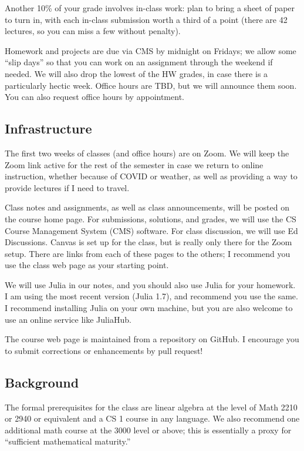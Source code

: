 \documentclass[12pt, leqno]{article}
\begin{document}
Another 10\% of your grade involves in-class work: plan to bring a
sheet of paper to turn in, with each in-class submission worth a third
of a point (there are 42 lectures, so you can miss a few without
penalty).

Homework and projects are due via CMS by midnight on Fridays; we allow
some ``slip days'' so that you can work on an assignment through the
weekend if needed.  We will also drop the lowest of the HW grades, in
case there is a particularly hectic week.  Office hours are TBD,
but we will announce them soon.  You can also request office
hours by appointment.

\subsection{Infrastructure}

The first two weeks of classes (and office hours) are on
Zoom.  We will keep the Zoom link active for the rest of the semester
in case we return to online instruction, whether because of COVID or
weather, as well as providing a way to provide lectures if I need to
travel.

Class notes and assignments, as well as class announcements, will be
posted on the course home page.  For submissions, solutions, and
grades, we will use the CS Course Management System (CMS) software.
For class discussion, we will use Ed Discussions.  Canvas is set up
for the class, but is really only there for the Zoom setup.  There are
links from each of these pages to the others; I recommend you use the
class web page as your starting point.

We will use Julia in our notes, and you should also use Julia for your
homework.  I am using the most recent version (Julia 1.7), and
recommend you use the same.  I recommend installing Julia on your own
machine, but you are also welcome to use an online service like JuliaHub.

The course web page is maintained from a repository on GitHub.
I encourage you to submit corrections or enhancements by pull
request!

\subsection{Background}

The formal prerequisites for the class are linear algebra at the level
of Math 2210 or 2940 or equivalent and a CS 1 course in any language.
We also recommend one additional math course at the 3000 level or
above; this is essentially a proxy for ``sufficient mathematical
maturity.''
\end{document}
